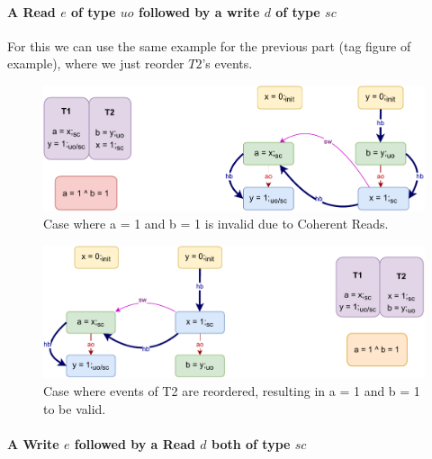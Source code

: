     \paragraph{A Read $e$ of type $uo$ followed by a write $d$ of type $sc$}

        For this we can use the same example for the previous part (tag figure of example), where we just reorder $T2$'s events.
        \begin{figure}[H]
            \centering
            \includegraphics[scale=0.7]{InstructionReordering/Example4(Ruo-Wsc).pdf}
            \caption{Case where a = 1 and b = 1 is invalid due to Coherent Reads.}
        \end{figure}

        \begin{figure}[H]
            \centering
            \includegraphics[scale=0.7]{InstructionReordering/Example4R(Ruo-Wsc).pdf}
            \caption{Case where events of T2 are reordered, resulting in  a = 1 and b = 1 to be valid.}
        \end{figure}

        
    \paragraph{A Write $e$ followed by a Read $d$ both of type $sc$}
        
